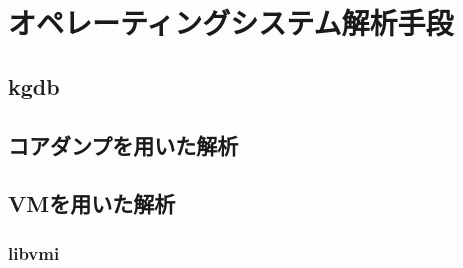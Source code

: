 \section{オペレーティングシステム解析手段}

\subsection{kgdb}

\subsection{コアダンプを用いた解析}

\subsection{VMを用いた解析}

\subsubsection{libvmi}

